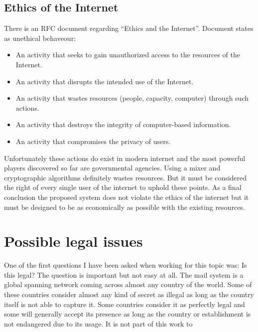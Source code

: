 \subsection{Ethics of the Internet}
There is an RFC document regarding ``Ethics and the Internet''\cite[p.~1]{RFC1087}. Document states as unethical behaveour:
\begin{itemize}
\item An activity that seeks to gain unauthorized access to the resources of the Internet.
\item An activity that disrupts the intended use of the Internet.
\item An activity that wastes resources (people, capacity, computer) through such actions.
\item An activity that destroys the integrity of computer-based information.
\item An activity that compromises the privacy of users.
\end{itemize}
Unfortunately these actions do exist in modern internet and the most powerful players discovered so far are governmental agencies. Using a mixer and cryptographic algorithms definitely wastes resources. But it must be considered the right of every single user of the internet to uphold these points. As a final conclusion the proposed system does not violate the ethics of the internet but it must be designed to be as economically as possible with the existing resources.

\section{Possible legal issues}
One of the first questions I have been asked when working for this topic was: Is this legal? The question is important but not easy at all. The mail system is a global spanning network coming across almost any country of the world. Some of these countries consider almost any kind of secret as illegal as long as the country itself is not able to capture it. Some countries consider it as perfectly legal and some will generally accept its presence as long as the country or establishment is not endangered due to its usage. It is not part of this work to \par

